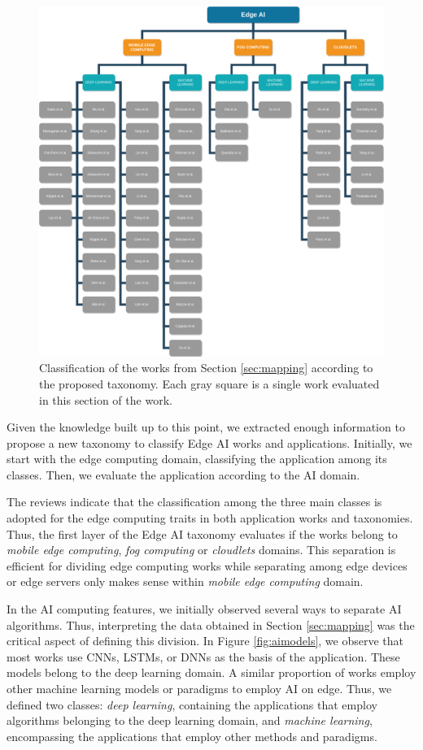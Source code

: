 \begin{figure}[ht!]
    \centering
    \includegraphics[width=\linewidth]{Figures/taxonomy.png}
    \caption{Classification of the works from Section \ref{sec:mapping} according to the proposed taxonomy. Each gray square is a single work evaluated in this section of the work.}
    \label{fig:taxonomy}
\end{figure}

Given the knowledge built up to this point, we extracted enough information to propose a new taxonomy to classify Edge AI works and applications. Initially, we start with the edge computing domain, classifying the application among its classes. Then, we evaluate the application according to the AI domain.

The reviews indicate that the classification among the three main classes is adopted for the edge computing traits in both application works and taxonomies. Thus, the first layer of the Edge AI taxonomy evaluates if the works belong to \textit{mobile edge computing}, \textit{fog computing} or \textit{cloudlets} domains. This separation is efficient for dividing edge computing works while separating among edge devices or edge servers only makes sense within \textit{mobile edge computing} domain.

In the AI computing features, we initially observed several ways to separate AI algorithms. Thus, interpreting the data obtained in Section \ref{sec:mapping} was the critical aspect of defining this division. In Figure \ref{fig:aimodels}, we observe that most works use CNNs, LSTMs, or DNNs as the basis of the application. These models belong to the deep learning domain. A similar proportion of works employ other machine learning models or paradigms to employ AI on edge. Thus, we defined two classes: \textit{deep learning}, containing the applications that employ algorithms belonging to the deep learning domain, and \textit{machine learning}, encompassing the applications that employ other methods and paradigms.

